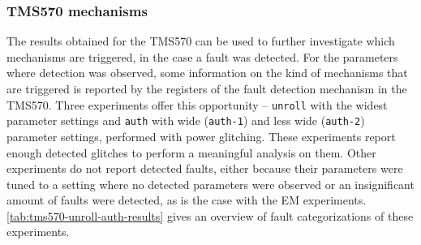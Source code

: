 \documentclass[10pt]{article}
\newcommand{\TI}{TMS570\xspace}
\newcommand{\unroll}{\texttt{unroll}\xspace}
\newcommand{\auth}{\texttt{auth}\xspace}
\newcommand{\authone}{\texttt{auth-1}\xspace}
\newcommand{\authtwo}{\texttt{auth-2}\xspace}
\begin{document}
    \subsubsection{\TI mechanisms } %

      The results obtained for the \TI can be used to further investigate which mechanisms are triggered, in the case a fault was detected. 
      For the parameters where detection was observed, some information on the kind of mechanisms that are triggered is reported by the registers of the fault detection mechanism in the \TI. Three experiments offer this opportunity -- \unroll with the widest parameter settings and \auth with wide (\authone) and less wide (\authtwo) parameter settings, performed with power glitching. These experiments report enough detected glitches to perform a meaningful analysis on them. Other experiments do not report detected faults, either because their parameters were tuned to a setting where no detected parameters were observed or an insignificant amount of faults were detected, as is the case with the EM experiments. \autoref{tab:tms570-unroll-auth-results} gives an overview of fault categorizations of these experiments.
\end{document}
